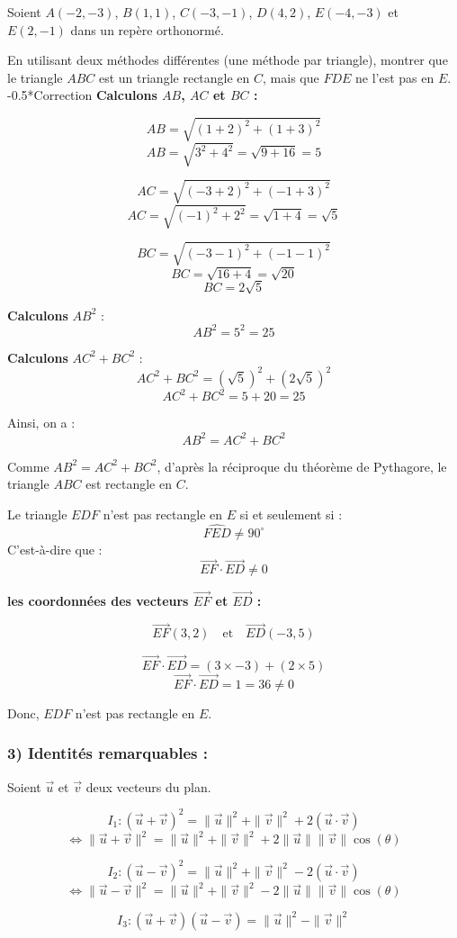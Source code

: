\documentclass{article}
\makeatletter
\renewcommand\subsection{\@startsection{subsection}{2}{0mm}%
    {-\baselineskip}{0.5\baselineskip}{\normalfont\bfseries\color{red}}}
\makeatother
\begin{document}
Soient $A(-2, -3)$, $B(1, 1)$, $C(-3, -1)$, $D(4, 2)$, $E(-4, -3)$ et $E(2, -1)$ dans un repère orthonormé.

En utilisant deux méthodes différentes (une méthode par triangle), montrer que le triangle $ABC$ est un triangle rectangle en $C$, mais que $FDE$ ne l'est pas en $E$.
\subsection*{Correction}
\textbf{Calculons $AB$, $AC$ et $BC$ :}

\[
AB = \sqrt{(1 + 2)^2 + (1 + 3)^2}
\]
\[
AB = \sqrt{3^2 + 4^2} = \sqrt{9 + 16} = 5
\]

\[
AC = \sqrt{(-3 + 2)^2 + (-1 + 3)^2}
\]
\[
AC = \sqrt{(-1)^2 + 2^2} = \sqrt{1 + 4} = \sqrt{5}
\]

\[
BC = \sqrt{(-3 - 1)^2 + (-1 - 1)^2}
\]
\[
BC = \sqrt{16 + 4} = \sqrt{20}
\]
\[
BC = 2\sqrt{5}
\]

\textbf{Calculons} $AB^2$ :
\[
AB^2 = 5^2 = 25
\]

\textbf{Calculons} $AC^2 + BC^2$ :
\[
AC^2 + BC^2 = (\sqrt{5})^2 + (2\sqrt{5})^2
\]
\[
AC^2 + BC^2 = 5 + 20 = 25
\]

Ainsi, on a :
\[
AB^2 = AC^2 + BC^2
\]

Comme $AB^2 = AC^2 + BC^2$, d'après la réciproque du théorème de Pythagore, le triangle $ABC$ est rectangle en $C$.

Le triangle $EDF$ n'est pas rectangle en $E$ si et seulement si :
\[
\widehat{FED} \neq 90^\circ
\]
C'est-à-dire que :
\[
\vec{EF} \cdot \vec{ED} \neq 0
\]

\textbf{les coordonnées des vecteurs $\vec{EF}$ et $\vec{ED}$ :}

\[
\vec{EF}(3, 2) \quad \text{et} \quad \vec{ED}(-3, 5)
\]

\[
\vec{EF} \cdot \vec{ED} = (3 \times -3) + (2 \times 5)
\]
\[
\vec{EF} \cdot \vec{ED} = 1 = 36 \neq 0
\]

Donc, $EDF$ n'est pas rectangle en $E$.

\subsubsection*{3) Identités remarquables :}

Soient $\vec{u}$ et $\vec{v}$ deux vecteurs du plan.

\[
I_1 : (\vec{u} + \vec{v})^2 = \|\vec{u}\|^2 + \|\vec{v}\|^2 + 2(\vec{u} \cdot \vec{v})
\]
\[
\iff \|\vec{u} + \vec{v}\|^2 = \|\vec{u}\|^2 + \|\vec{v}\|^2 + 2\|\vec{u}\|\|\vec{v}\| \cos(\theta)
\]

\[
I_2 : (\vec{u} - \vec{v})^2 = \|\vec{u}\|^2 + \|\vec{v}\|^2 - 2(\vec{u} \cdot \vec{v})
\]
\[
\iff \|\vec{u} - \vec{v}\|^2 = \|\vec{u}\|^2 + \|\vec{v}\|^2 - 2\|\vec{u}\|\|\vec{v}\| \cos(\theta)
\]

\[
I_3 : (\vec{u} + \vec{v})(\vec{u} - \vec{v}) = \|\vec{u}\|^2 - \|\vec{v}\|^2
\]
\end{document}
